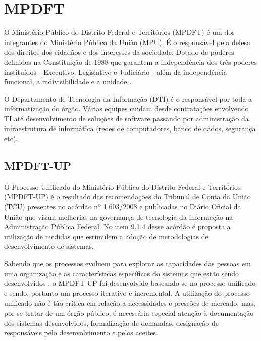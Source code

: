 \documentclass[
	article,			%
	11pt,				%
	oneside,			%
	a4paper,			%
	english,			%
	brazil,				%
	sumario=tradicional
	]{abntex2}
\begin{document}



\section{MPDFT}

O Ministério Público do Distrito Federal e Territórios (MPDFT) é um dos
integrantes do Ministério Público da União (MPU). É o responsável pela defesa
dos direitos dos cidadãos e dos interesses da sociedade. Dotado de poderes
definidos na Constituição de 1988 que garantem a independência dos três poderes
instituídos - Executivo, Legislativo e Judiciário - além da independência
funcional, a indivisibilidade e a unidade \cite{mpdft}.

O Departamento de Tecnologia da Informação (DTI) é o responsável por toda a
informatização do órgão. Várias equipes cuidam desde contratações envolvendo TI
até desenvolvimento de soluções de software passando por administração da
infraestrutura de informática (redes de computadores, banco de dados, segurança
etc).

\subsection{MPDFT-UP}

O Processo Unificado do Ministério Público do Distrito Federal e Territórios
(MPDFT-UP) \cite{mpdft-up} é o resultado das recomendações do Tribunal de Conta
da União (TCU) presentes no acórdão nº 1.603/2008 \cite{acordao-tcu-1603-2008}
e publicadas no Diário Oficial da União \cite{dou-20080818} que visam melhorias
na governança de tecnologia da informação na Administração Pública Federal. No
item 9.1.4 desse acórdão é proposta a utilização de medidas que estimulem a
adoção de metodologias de desenvolvimento de sistemas.

Sabendo que os processos evoluem para explorar as capacidades das pessoas em uma
organização e as características específicas do sistemas que estão sendo
desenvolvidos \cite{sommerville2007}, o MPDFT-UP foi desenvolvido baseando-se
no processo unificado e sendo, portanto um processo iterativo e incremental. A
utilização do processo unificado não é tão crítica em relação a necessidades e
pressões de mercado, mas, por se tratar de um órgão público, é necessária
especial atenção à documentação dos sistemas desenvolvidos, formalização de
demandas, designação de responsáveis pelo desenvolvimento e pelos aceites.
\end{document}
